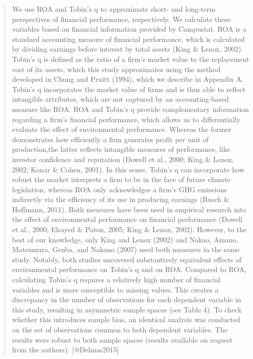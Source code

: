 \documentclass[]{article}
\begin{document}
\begin{quote}
We use ROA and Tobin's q to approximate short- and long-term
perspectives of financial performance, respectively. We calculate these
variables based on financial information provided by Compustat. ROA is a
standard accounting measure of financial performance, which is
calculated by dividing earnings before interest by total assets (King \&
Lenox, 2002). Tobin's q is defined as the ratio of a firm's market value
to the replacement cost of its assets, which this study approximates
using the method developed in Chung and Pruitt (1994), which we describe
in Appendix A. Tobin's q incorporates the market value of firms and is
thus able to reflect intangible attributes, which are not captured by an
accounting-based measure like ROA. ROA and Tobin's q provide
complementary information regarding a firm's financial performance,
which allows us to differentially evaluate the effect of environmental
performance. Whereas the former demonstrates how efficiently a firm
generates profit per unit of production,the latter reflects intangible
measures of performance, like investor confidence and reputation (Dowell
et al., 2000; King \& Lenox, 2002; Konar \& Cohen, 2001). In this sense,
Tobin's q can incorporate how robust the market interprets a firm to be
in the face of future climate legislation, whereas ROA only acknowledges
a firm's GHG emissions indirectly via the efficiency of its use in
producing earnings (Busch \& Hoffmann, 2011). Both measures have been
used in empirical research into the effect of environmental performance
on financial performance (Dowell et al., 2000; Elsayed \& Paton, 2005;
King \& Lenox, 2002). However, to the best of our knowledge, only King
and Lenox (2002) and Nakao, Amano, Matsumura, Genba, and Nakano (2007)
used both measures in the same study. Notably, both studies uncovered
substantively equivalent effects of environmental performance on Tobin's
q and on ROA. Compared to ROA, calculating Tobin's q requires a
relatively high number of financial variables and is more susceptible to
missing values. This creates a discrepancy in the number of observations
for each dependent variable in this study, resulting in asymmetric
sample spaces (see Table 4). To check whether this introduces sample
bias, an identical analysis was conducted on the set of observations
common to both dependent variables. The results were robust to both
sample spaces (results available on request from the authors).
{[}@Delmas2015{]}
\end{quote}
\end{document}
